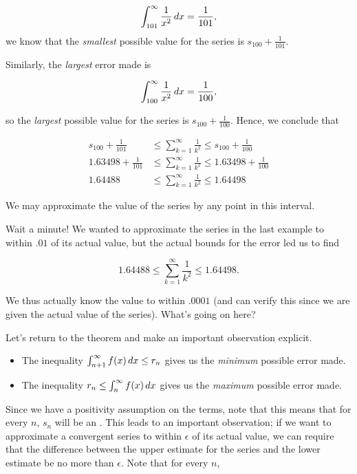 \documentclass{ximera}
\begin{document}
\begin{model}
\[
\int_{101}^{\infty} \frac{1}{x^2} \,d x = \frac{1}{101},
\]
we know that the \emph{smallest} possible value for the series is $s_{100} +  \frac{1}{101}$.  

Similarly, the \emph{largest} error made is 

\[
\int_{100}^{\infty} \frac{1}{x^2} \,d x = \frac{1}{100},
\] 

so the \emph{largest} possible value for the series is $s_{100} +  \frac{1}{100}$.  Hence, we conclude that

\begin{align*}
s_{100} + \frac{1}{101} &\leq \sum_{k=1}^{\infty} \frac{1}{k^2} \leq s_{100} +  \frac{1}{100} \\
1.63498 + \frac{1}{101} & \leq \sum_{k=1}^{\infty} \frac{1}{k^2} \leq 1.63498 + \frac{1}{100} \\
1.64488 &\leq \sum_{k=1}^{\infty} \frac{1}{k^2} \leq 1.64498
\end{align*}

We may approximate the value of the series by any point in this interval.
\end{model}

Wait a minute!  We wanted to approximate the series in the last example to within $.01$ of its actual value, but the actual bounds for the error led us to find 

\[
1.64488 \leq \sum_{k=1}^{\infty} \frac{1}{k^2} \leq 1.64498. 
\]

We thus actually know the value to within $.0001$ (and can verify this since we are given the actual value of the series).  What's going on here?  

Let's return to the theorem and make an important observation explicit.

\begin{itemize}
\item The inequality $\int_{n+1}^{\infty} f(x) \,d x \leq  r_n$ gives us the \emph{minimum} possible error made.
\item The inequality $r_n \leq \int_{n}^{\infty} f(x) \,d x$ gives us the \emph{maximum} possible error made.
\end{itemize}

Since we have a positivity assumption on the terms, note that this means that for every $n$, $s_n$ will be an .  This leads to an important observation; if we want to approximate a convergent series to within $\epsilon$ of its actual value, we can require that the difference between the upper estimate for the series and the lower estimate be no more than $\epsilon$.  Note that for every $n$,
\end{document}
